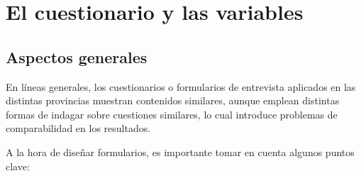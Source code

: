 \documentclass[
]{book}
\begin{document}
\hypertarget{el-cuestionario-y-las-variables}{%
\section{El cuestionario y las variables}\label{el-cuestionario-y-las-variables}}

\hypertarget{aspectos-generales}{%
\subsection{Aspectos generales}\label{aspectos-generales}}

En líneas generales, los cuestionarios o formularios de entrevista aplicados en las distintas provincias muestran contenidos similares, aunque emplean distintas formas de indagar sobre cuestiones similares, lo cual introduce problemas de comparabilidad en los resultados.

A la hora de diseñar formularios, es importante tomar en cuenta algunos puntos clave:
\end{document}
